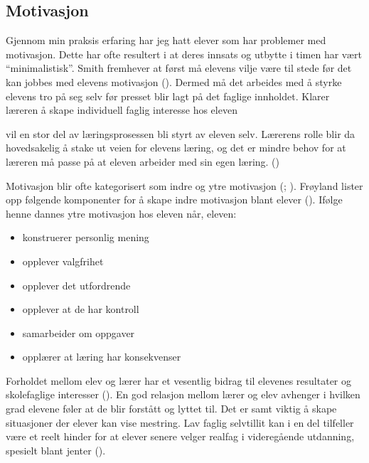 \documentclass[main.tex]{subfiles}
\begin{document}
\subsection*{Motivasjon}

Gjennom min praksis erfaring har jeg hatt elever som har problemer med motivasjon. Dette har ofte resultert i at deres innsats og utbytte i timen har vært ``minimalistisk''. Smith fremhever at først må elevens vilje være til stede før det kan jobbes med elevens motivasjon (). Dermed må det arbeides med å styrke elevens tro på seg selv før presset blir lagt på det faglige innholdet. Klarer læreren å skape individuell faglig interesse hos eleven 
\begin{displayquote}
\textelp{} vil en stor del av læringsprosessen bli styrt av eleven selv. Lærerens rolle blir da hovedsakelig å stake ut veien for elevens læring, og det er mindre behov for at læreren må passe på at eleven arbeider med sin egen læring. \newline ()
\end{displayquote} 
Motivasjon blir ofte kategorisert som indre og ytre motivasjon (; ). Frøyland lister opp følgende komponenter for å skape indre motivasjon blant elever (). Ifølge henne dannes ytre motivasjon hos eleven når, eleven:
\begin{itemize}
\item konstruerer personlig mening  
\item opplever valgfrihet
\item opplever det utfordrende
\item opplever at de har kontroll
\item samarbeider om oppgaver
\item opplærer at læring har konsekvenser
\end{itemize}
Forholdet mellom elev og lærer har et vesentlig bidrag til elevenes resultater og skolefaglige interesser (). En god relasjon mellom lærer og elev avhenger i hvilken grad elevene føler at de blir forstått og lyttet til. 
Det er samt viktig å skape situasjoner der elever kan vise mestring. Lav faglig selvtillit kan i en del tilfeller være et reelt hinder for at elever senere velger realfag i videregående utdanning, spesielt blant jenter ().
\end{document}
